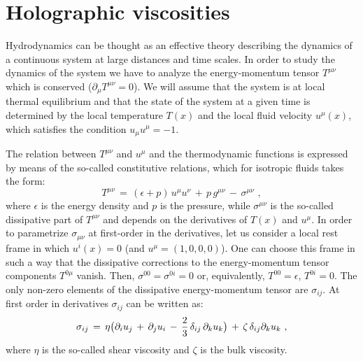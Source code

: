 \documentclass[12pt,notitlepage,a4paper]{article}
\newcommand{\beq}{\begin{equation}}
\newcommand{\eeq}{\end{equation}}
\begin{document}
\section{Holographic viscosities}
Hydrodynamics can be thought as an effective theory describing the dynamics of a continuous system at large distances and time scales. In order to study the dynamics of the system we have to analyze the energy-momentum tensor $T^{\mu\nu}$ which  is conserved ($\partial_{\mu}T^{\mu\nu}=0$). We will assume that the system is at local thermal equilibrium and that the state of the system at a given time is determined by the local temperature $T(x)$ and the local fluid velocity $u^{\mu}(x)$, which satisfies the condition $u_{\mu}u^{\mu}=-1$. 

The relation between $T^{\mu\nu}$ and $u^{\mu}$ and the thermodynamic functions is expressed by means of the so-called constitutive relations, which for isotropic fluids takes the form:
\beq
T^{\mu\nu}\,=\,(\epsilon+p)\,u^{\mu} u^{\nu}\,+\,p\,g^{\mu\nu}\,-\,\sigma^{\mu\nu}\,\,,
\eeq
where $\epsilon$ is the energy density and $p$ is the pressure, while $\sigma^{\mu\nu}$ is the so-called dissipative part of $T^{\mu\nu}$ and depends on the derivatives of $T(x)$ and $u^{\mu}$.  In order to parametrize $\sigma_{\mu\nu}$ at first-order in the derivatives, let us consider a local rest frame in which $u^{i}(x)=0$ (and $u^{\mu}=(1,0,0,0)$). One can choose this frame in such a way that the dissipative corrections to the energy-momentum tensor components $T^{0\mu}$ vanish. Then, $\sigma^{00}=\sigma^{0i}=0$ or, equivalently, $T^{00}=\epsilon$,  $T^{0i}=0$. The only non-zero elements of the dissipative energy-momentum  tensor are $\sigma_{ij}$. At first order in derivatives $\sigma_{ij}$ can be written as:
\beq
\sigma_{ij}\,=\,\eta \big(\partial_{i}u_j\,+\,\partial_{j} u_i\,-\,{2\over 3}\,\delta_{ij}\,\partial_k u_k\big)\,+\,\zeta\,\delta_{ij} \partial_k u_k\,\,,
\eeq
where $\eta$ is the so-called shear viscosity and $\zeta$ is the bulk viscosity. 
\end{document}
